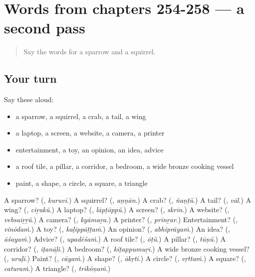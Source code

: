 \section[(dialogue)]{Words from chapters 254-258 — a second pass}

\label{lesson:ML-R258-second-pass-words-from-chapters-254-258}



\begin{quote}
Say the words for a sparrow and a squirrel.
\end{quote}

\subsection*{Your turn}
Say these aloud:

\begin{itemize}
\raggedright
  \item a sparrow, a squirrel, a crab, a tail, a wing
  \item a laptop, a screen, a website, a camera, a printer
  \item entertainment, a toy, an opinion, an idea, advice
  \item a roof tile, a pillar, a corridor, a bedroom, a wide bronze cooking vessel
  \item paint, a shape, a circle, a square, a triangle
\end{itemize}

\begin{tcolorbox}[breakable,colback=teal!4,colframe=teal!35!black,title={Before you move on}]
A sparrow? (\textbf{}, \emph{kuruvi}.) A squirrel? (\textbf{}, \emph{aṇṇān}.) A crab? (\textbf{}, \emph{ñaṇṭŭ}.) A tail? (\textbf{}, \emph{vāl}.) A wing? (\textbf{}, \emph{ciṟakŭ}.) A laptop? (\textbf{}, \emph{lāpṭōppŭ}.) A screen? (\textbf{}, \emph{skrīn}.) A website? (\textbf{}, \emph{vebsaiṟṟŭ}.) A camera? (\textbf{}, \emph{kyāmaṟa}.) A printer? (\textbf{}, \emph{prinṟar}.) Entertainment? (\textbf{}, \emph{vinōdaṁ}.) A toy? (\textbf{}, \emph{kaḷippāṭṭaṁ}.) An opinion? (\textbf{}, \emph{abhiprāyaṁ}.) An idea? (\textbf{}, \emph{āśayaṁ}.) Advice? (\textbf{}, \emph{upadēśaṁ}.) A roof tile? (\textbf{}, \emph{ōṭŭ}.) A pillar? (\textbf{}, \emph{tūṇŭ}.) A corridor? (\textbf{}, \emph{iṭanāḻi}.) A bedroom? (\textbf{}, \emph{kiṭappumuṟi}.) A wide bronze cooking vessel? (\textbf{}, \emph{uruḷi}.) Paint? (\textbf{}, \emph{cāyaṁ}.) A shape? (\textbf{}, \emph{ākṛti}.) A circle? (\textbf{}, \emph{vṛttaṁ}.) A square? (\textbf{}, \emph{caturaṁ}.) A triangle? (\textbf{}, \emph{trikōṇaṁ}.)
\end{tcolorbox}
